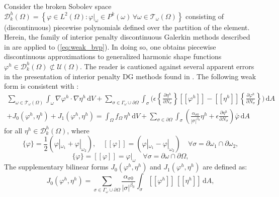 	Consider the broken Sobolev space $\mathcal{D}^h_k (\Omega) = \left\{ \varphi \in L^2 (\Omega) : \varphi|_{\omega} \in P^k (\omega) \, \forall \omega \in \mathcal{T}_\omega (\Omega) \right\}$ consisting of (discontinuous) piecewise polynomials defined over the partition of the element. Herein, the family of interior penalty discontinuous Galerkin methods described in \cite{Riviere:08} are applied to (\ref{eq:weak_bvp}). In doing so, one obtains piecewise discontinuous approximations to generalized harmonic shape functions $\varphi^h \in \mathcal{D}^h_k (\Omega) \not\subset \mathcal{U} (\Omega)$. The reader is cautioned against several apparent errors in the presentation of interior penalty DG methods found in \cite{Riviere:08}. The following weak form is consistent with \cite{Riviere:01}:
	\begin{eqnarray}
		\sum_{\omega \in \mathcal{T}_\omega (\Omega)} \int_{\omega} \nabla \varphi^h \cdot \nabla \eta^h \, \mathrm dV + \sum_{\sigma \in \Gamma_\omega \cup \partial \Omega} \int_{\sigma} \bigg( \epsilon \left\{ \frac{\partial \eta^h}{\partial N_{\sigma}} \right\} [\![ \varphi^h ]\!] - [\![ \eta^h ]\!] \left\{ \frac{\partial \varphi^h}{\partial N_{\sigma}} \right\}  \bigg) \, \mathrm dA \nonumber \\ + J_0 (\varphi^h,\eta^h) + J_1 (\varphi^h,\eta^h) = \int_{\Omega} f_{\Omega} \, \eta^h \, \mathrm dV + \sum_{\sigma \in \partial \Omega} \int_{\sigma} \left(\frac{\alpha_{\sigma0}}{|\sigma|^{\beta_0}} \eta^h + \epsilon \frac{\partial \eta^h}{\partial N_{\sigma}} \right) \bar{\varphi} \, \mathrm dA
		\label{eq:dg_poisson}
	\end{eqnarray}
	for all $\eta^h \in \mathcal{D}^h_k (\Omega)$, where
	\begin{equation}
		\{ \varphi \} = \frac{1}{2} (\varphi|_{\omega_1} + \varphi|_{\omega_2}), \quad [\![ \varphi ]\!] = (\varphi|_{\omega_1} - \varphi|_{\omega_2}) \quad \forall \sigma = \partial \omega_1 \cap \partial \omega_2,
		\label{eq:internal_jumps}
	\end{equation}
	\begin{equation}
		\{ \varphi \} = [\![ \varphi ]\!] = \varphi|_{\omega} \quad \forall \sigma = \partial \omega \cap \partial \Omega,
		\label{eq:external_jumps}
	\end{equation}
	The supplementary bilinear forms $J_0 (\varphi^h,\eta^h)$ and $J_1 (\varphi^h,\eta^h)$ are defined as:
	\begin{equation}
		J_0 (\varphi^h,\eta^h) = \sum_{\sigma \in \Gamma_\omega \cup \partial \Omega} \frac{\alpha_{\sigma0}}{|\sigma|^{\beta_0}} \int_{\sigma} [\![ \varphi^h ]\!] \, [\![ \eta^h ]\!] \, \mathrm dA,
	\end{equation}
